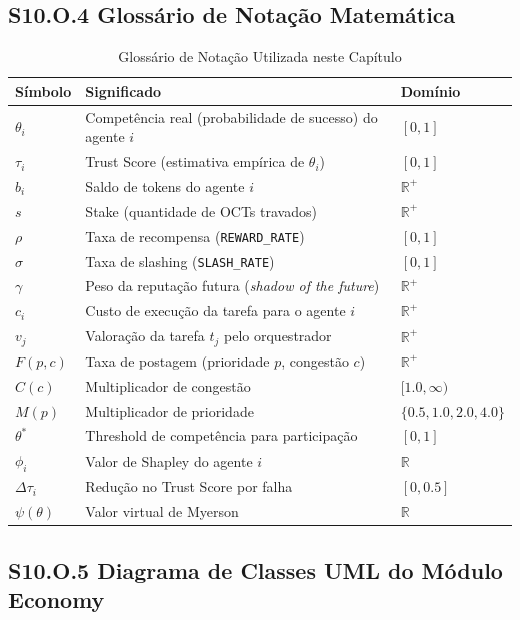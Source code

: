 \subsection*{S10.O.4 Glossário de Notação Matemática}

\begin{table}[htbp]
\centering
\caption{Glossário de Notação Utilizada neste Capítulo}
\label{tab:notation}
\begin{tabular}{p{2cm}p{8cm}p{4cm}}
\hline
\textbf{Símbolo} & \textbf{Significado} & \textbf{Domínio} \\
\hline
$\theta_i$ & Competência real (probabilidade de sucesso) do agente $i$ & $[0, 1]$ \\
\hline
$\tau_i$ & Trust Score (estimativa empírica de $\theta_i$) & $[0, 1]$ \\
\hline
$b_i$ & Saldo de tokens do agente $i$ & $\mathbb{R}^+$ \\
\hline
$s$ & Stake (quantidade de OCTs travados) & $\mathbb{R}^+$ \\
\hline
$\rho$ & Taxa de recompensa (\texttt{REWARD\_RATE}) & $[0, 1]$ \\
\hline
$\sigma$ & Taxa de slashing (\texttt{SLASH\_RATE}) & $[0, 1]$ \\
\hline
$\gamma$ & Peso da reputação futura (\textit{shadow of the future}) & $\mathbb{R}^+$ \\
\hline
$c_i$ & Custo de execução da tarefa para o agente $i$ & $\mathbb{R}^+$ \\
\hline
$v_j$ & Valoração da tarefa $t_j$ pelo orquestrador & $\mathbb{R}^+$ \\
\hline
$F(p, c)$ & Taxa de postagem (prioridade $p$, congestão $c$) & $\mathbb{R}^+$ \\
\hline
$C(c)$ & Multiplicador de congestão & $[1.0, \infty)$ \\
\hline
$M(p)$ & Multiplicador de prioridade & $\{0.5, 1.0, 2.0, 4.0\}$ \\
\hline
$\theta^*$ & Threshold de competência para participação & $[0, 1]$ \\
\hline
$\phi_i$ & Valor de Shapley do agente $i$ & $\mathbb{R}$ \\
\hline
$\Delta\tau_i$ & Redução no Trust Score por falha & $[0, 0.5]$ \\
\hline
$\psi(\theta)$ & Valor virtual de Myerson & $\mathbb{R}$ \\
\hline
\end{tabular}
\end{table}

\subsection*{S10.O.5 Diagrama de Classes UML do Módulo Economy}

